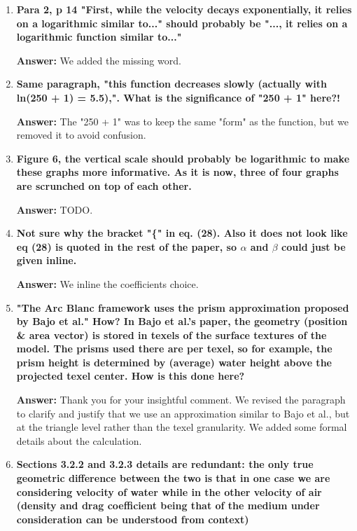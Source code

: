 \documentclass{article}
\newcommand{\answer}[1]{\textbf{\textcolor{answercolor}{Answer:}} \textcolor{answercolor}{#1}}
\begin{document}
\begin{enumerate}[label=\textbf{\arabic*.}]
    \item \textbf{Para 2, p 14 "First, while the velocity decays exponentially, it relies on a logarithmic similar to..." should probably be "..., it relies on a logarithmic function similar to..."}
    
    \answer{We added the missing word.}

    \item \textbf{Same paragraph, "this function decreases slowly (actually with ln(250 + 1) = 5.5),". What is the significance of "250 + 1" here?!}
    
    \answer{The "250 + 1" was to keep the same "form" as the function, but we removed it to avoid confusion.}

    \item \textbf{Figure 6, the vertical scale should probably be logarithmic to make these graphs more informative. As it is now, three of four graphs are scrunched on top of each other.}
    
    \answer{TODO.}

    \item \textbf{Not sure why the bracket "\{" in eq. (28). Also it does not look like eq (28) is quoted in the rest of the paper, so $\alpha$ and $\beta$ could just be given inline.}
    
    \answer{We inline the coefficients choice.}

    \item \textbf{"The Arc Blanc framework uses the prism approximation proposed by Bajo et al." How? In Bajo et al.’s paper, the geometry (position \& area vector) is stored in texels of the surface textures of the model. The prisms used there are per texel, so for example, the prism height is determined by (average) water height above the projected texel center. How is this done here?}
    
    \answer{Thank you for your insightful comment. We revised the paragraph to clarify and justify that we use an approximation similar to Bajo et al., but at the triangle level rather than the texel granularity. We added some formal details about the calculation.}

    \item \textbf{Sections 3.2.2 and 3.2.3 details are redundant: the only true geometric difference between the two is that in one case we are considering velocity of water while in the other velocity of air (density and drag coefficient being that of the medium under consideration can be understood from context)}
    

\end{enumerate}
\end{document}
